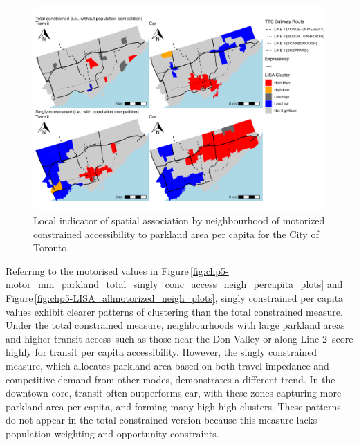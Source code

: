 \documentclass[
11pt, %
oneside, %
english, %
singlespacing, %
]{macthesis} %
\begin{document}
\begin{figure}

{\centering \includegraphics[width=6in]{./data/figures/chp5-LISA_allmotorized_neigh_plots} 

}

\caption{\label{fig:chp5-LISA_allmotorized_neigh_plots} Local indicator of spatial association by neighbourhood of motorized constrained accessibility to parkland area per capita for the City of Toronto.}\label{fig:unnamed-chunk-83}
\end{figure}

Referring to the motorised values in Figure\,\ref{fig:chp5-motor_mm_parkland_total_singly_conc_access_neigh_percapita_plots} and Figure\,\ref{fig:chp5-LISA_allmotorized_neigh_plots}, singly constrained per capita values exhibit clearer patterns of clustering than the total constrained measure. Under the total constrained measure, neighbourhoods with large parkland areas and higher transit access--such as those near the Don Valley or along Line 2--score highly for transit per capita accessibility. However, the singly constrained measure, which allocates parkland area based on both travel impedance and competitive demand from other modes, demonstrates a different trend. In the downtown core, transit often outperforms car, with these zones capturing more parkland area per capita, and forming many high-high clusters. These patterns do not appear in the total constrained version because this measure lacks population weighting and opportunity constraints.
\end{document}
